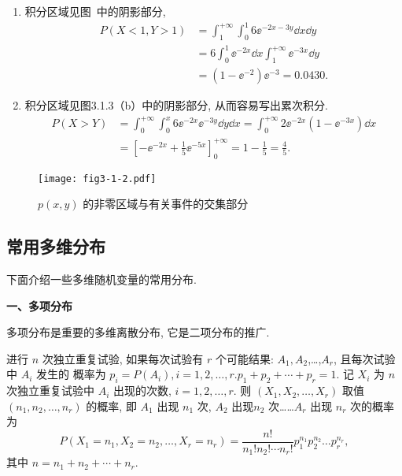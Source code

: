    \begin{solution}
  		\begin{enumerate}
  		\item 积分区域见图~中的阴影部分, 
  		\begin{align*} 
  		 P(X<1, Y>1) &=\int_{1}^{+\infty} \int_{0}^{1} 6 \ee^{-2 x-3 y} \dd x \dd y \\
  		 &=6 \int_{0}^{1} \ee^{-2 x} \dd x \int_{1}^{+\infty} \ee^{-3 x} \dd y \\ 
  		 &=\left(1-\ee^{-2}\right) \ee^{-3}=0.0430. 
  		\end{align*}
  		\item 积分区域见图3.1.3（b）中的阴影部分, 从而容易写出累次积分.
  		\begin{align*} 
  		 P(X>Y) &=\int_{0}^{+\infty} \int_{0}^{x} 6 \ee^{-2 x} \ee^{-3 y} \dd y \dd x=
  		 \int_{0}^{+\infty} 2 \ee^{-2 x}\left(1-\ee^{-3 x}\right) \dd x \\ 
  		 &=\left[-\ee^{-2 x}+\frac{1}{5} \ee^{-5 x}\right]_{0}^{+\infty}=1-\frac{1}{5}=\frac{4}{5} .
  		\end{align*}
  		\end{enumerate}             
   \end{solution}
   \begin{figure}[htbp]
   \centering
   \texttt{[image: fig3-1-2.pdf]}
   \caption{$p(x,y)$ 的非零区域与有关事件的交集部分}\label{fig:3.1.3}
   \end{figure}
   
  \subsection{常用多维分布}\label{ssec:3.1.5}
  下面介绍一些多维随机变量的常用分布. 
   
  \textbf{一、多项分布}
   
  多项分布是重要的多维离散分布, 它是二项分布的推广.
  
  进行 $n$ 次独立重复试验, 如果每次试验有 $r$ 个可能结果: $A_1, A_2$,\ldots,$A_r$, 且每次试验中 $A_i$ 发生的
  概率为 $p_{i}=P\left(A_{i}\right), i=1,2, \ldots, r . p_{1}+p_{2}+\cdots+p_{r}=1$.
  记 $X_i$ 为 $n$ 次独立重复试验中 $A_i$ 出现的次数, $i=1,2,\ldots,r$. 则 $(X_1,X_2,\ldots,X_r)$ 
  取值 $(n_1,n_2,\ldots,n_r)$ 的概率, 即 $A_1$ 出现 $n_1$ 次, $A_2$ 出现$n_2$ 次\ldots\ldots $A_r$ 出现 $n_r$ 次的概率为
  \begin{equation}
	  P\left(X_{1}=n_{1}, X_{2}=n_{2}, \ldots, X_{r}=n_{r}\right)=\frac{n !}{n_{1} ! n_{2} ! \cdots n_{r} !} p_{1}^{n_{1}} p_{2}^{n_{2}} \ldots p_{r}^{n_r},
  \end{equation}
  其中 $n=n_1+n_2+\cdots+n_r$.
  
